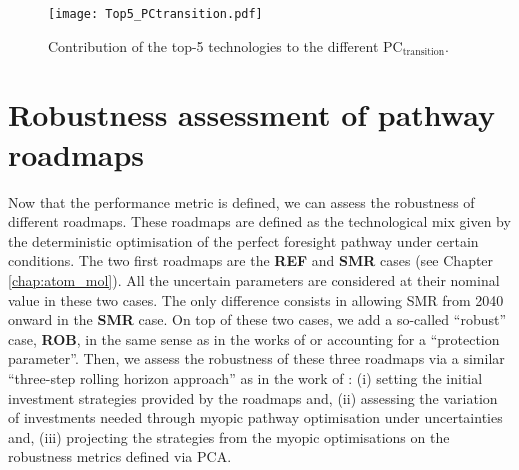 \begin{figure}[!htbp]
\centering
\texttt{[image: Top5\_PCtransition.pdf]}
\caption{Contribution of the top-5 technologies to the different $\text{PC}_{\text{transition}}$. }
\label{fig:Top5_PC_transition}
\end{figure}

\newpage
\section{Robustness assessment of pathway roadmaps}
\label{sec:RobPol:Rob_Assessment}
Now that the performance metric is defined, we can assess the robustness of different roadmaps. These roadmaps are defined as the technological mix given by the deterministic optimisation of the perfect foresight pathway under certain conditions. The two first roadmaps are the \textbf{REF} and \textbf{SMR} cases (see Chapter \ref{chap:atom_mol}). All the uncertain parameters are considered at their nominal value in these two cases. The only difference consists in allowing \gls{SMR} from 2040 onward in the \textbf{SMR} case. On top of these two cases, we add a so-called ``robust'' case, \textbf{ROB}, in the same sense as in the works of \citet{bertsimas2004price} or \citet{Moret2017PhDThesis} accounting for a ``protection parameter''. Then, we assess the robustness of these three roadmaps via a similar ``three-step rolling horizon approach'' as in the work of \citet{moret2020overcapacity}: (i) setting the initial investment strategies provided by the roadmaps and, (ii) assessing the variation of investments needed through myopic pathway optimisation under uncertainties and, (iii) projecting the strategies from the myopic optimisations on the robustness metrics defined via \gls{PCA}.

